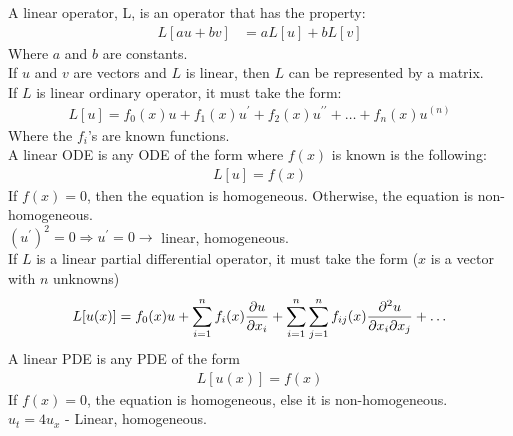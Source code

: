 \dfn A linear operator, L, is an operator that has the property:
\begin{align}
  L[au + bv] & = aL[u] + bL[v]
\end{align}
Where $a$ and $b$ are constants.\\
\thm If $u$ and $v$ are vectors and $L$ is linear, then $L$ can be represented by a matrix.\\
\thm If $L$ is linear ordinary operator, it must take the form:
\begin{align}
  L[u] = f_0(x)u + f_1(x)u^\prime + f_2(x)u^{\prime\prime} + \ldots + f_n(x)u^{(n)}
\end{align}
Where the $f_i$'s are known functions.\\
\dfn A linear ODE is any ODE of the form where $f(x)$ is known is the following:
\begin{align}
  L[u] = f(x)
\end{align}
If $f(x) = 0$, then the equation is homogeneous. Otherwise, the equation is non-homogeneous.\\
\ex $(u^\prime)^2 = 0 \Rightarrow u^\prime = 0 \rightarrow$ linear, homogeneous.\\
\thm If $L$ is a linear partial differential operator, it must take the form ($x$ is a vector with $n$ unknowns)
\begin{align}
  L[u(x)] = f_0(x)u + \sum^n_{i = 1} f_i(x) \frac{\partial u}{\partial x_i} +
  \sum^n_{i = 1} \sum^n_{j = 1} f_{ij}(x) \frac{\partial^2 u}{\partial x_i \partial x_j} + \ldots
\end{align}
\dfn A linear PDE is any PDE of the form
\begin{align}
  L[u(x)] = f(x)
\end{align}
If $f(x) = 0$, the equation is homogeneous, else it is non-homogeneous.\\
\ex $u_t = 4u_x$ - Linear, homogeneous.
\newpage

